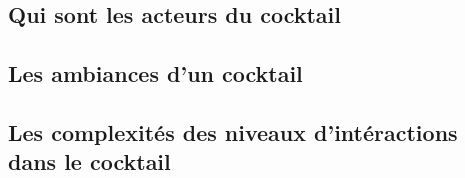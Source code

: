 


\subsection{Qui sont les acteurs du cocktail}


\subsection{Les ambiances d'un cocktail}




\subsection{Les complexités des niveaux d'intéractions dans le cocktail}


